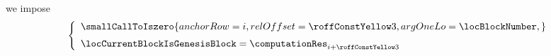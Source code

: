 \item[\underline{\underline{Detecting the genesis block:}}]
	we impose
	\[
		\left\{ \begin{array}{l}
			\smallCallToIszero {
				anchorRow = i                          ,
				relOffset = \TNTFgenesisBlockRowOffset ,
				argOneLo  = \locBlockNumber            ,
			}
			\vspace{2mm} \\
			\locCurrentBlockIsGenesisBlock
			=
			\computationRes _{i + \TNTFgenesisBlockRowOffset} \\
		\end{array} \right.
	\]
